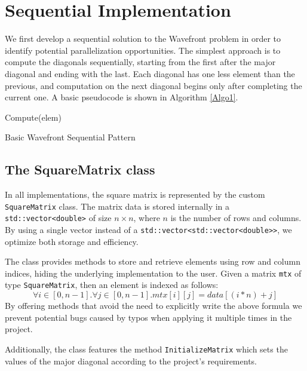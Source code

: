 \section*{Sequential Implementation}
We first develop a sequential solution to the Wavefront problem in order to identify potential parallelization opportunities. The simplest approach is to compute the diagonals sequentially, starting from the first after the major diagonal and ending with the last. Each diagonal has one less element than the previous, and computation on the next diagonal begins only after completing the current one. A basic pseudocode is shown in Algorithm \ref{Algo1}.  

\begin{algorithm}
\begin{algorithmic}
        \STATE Compute(elem)
    \ENDFOR
\ENDFOR
\end{algorithmic}
\caption{Basic Wavefront Sequential Pattern}
\label{Algo1}
\end{algorithm}


\subsection*{The SquareMatrix class}
\par 
In all implementations, the square matrix is represented by the custom \texttt{SquareMatrix} class. The matrix data is stored internally in a \texttt{std::vector<double>} of size $n \times n$, where $n$ is the number of rows and columns. By using a single vector instead of a \texttt{std::vector<std::vector<double>>}, we optimize both storage and efficiency.

\par The class provides methods to store and retrieve elements using row and column indices, hiding the underlying implementation to the user. Given a matrix \texttt{mtx} of type \texttt{SquareMatrix}, then an element is indexed as follows:
\begin{equation}
    \forall i \in [0, n - 1]. \forall j \in [0, n - 1]. mtx[i][j] = data[(i * n) + j]
\end{equation}
By offering methods that avoid the need to explicitly write the above formula we prevent potential bugs caused by typos when applying it multiple times in the project.

\par Additionally, the class features the method \texttt{InitializeMatrix} which sets the values of the major diagonal according to the project's requirements.

